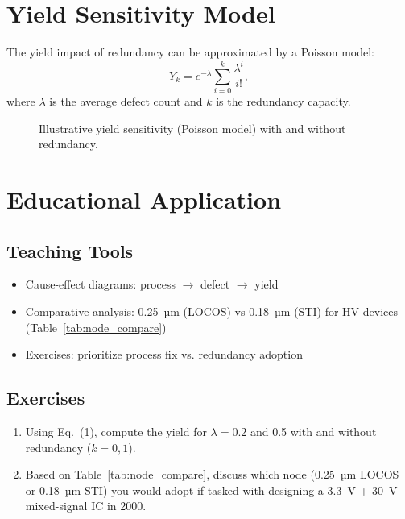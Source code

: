 \documentclass[conference]{IEEEtran}
\begin{document}
\section{Yield Sensitivity Model}
The yield impact of redundancy can be approximated by a Poisson model:
\[
Y_k = e^{-\lambda} \sum_{i=0}^{k} \frac{\lambda^i}{i!},
\]
where $\lambda$ is the average defect count and $k$ is the redundancy capacity.

\begin{figure}[!t]
  \centering
  \caption{Illustrative yield sensitivity (Poisson model) with and without redundancy.}
  \label{fig:yield}
\end{figure}

\section{Educational Application}
\subsection{Teaching Tools}
\begin{itemize}
    \item Cause-effect diagrams: process $\rightarrow$ defect $\rightarrow$ yield
    \item Comparative analysis: 0.25~µm (LOCOS) vs 0.18~µm (STI) for HV devices (Table~\ref{tab:node_compare})
    \item Exercises: prioritize process fix vs. redundancy adoption
\end{itemize}

\subsection{Exercises}
\begin{enumerate}
  \item Using Eq.~(1), compute the yield for $\lambda=0.2$ and 0.5 with and without redundancy ($k=0,1$).
  \item Based on Table~\ref{tab:node_compare}, discuss which node (0.25~µm LOCOS or 0.18~µm STI) you would adopt if tasked with designing a 3.3~V + 30~V mixed-signal IC in 2000.
\end{enumerate}
\end{document}
